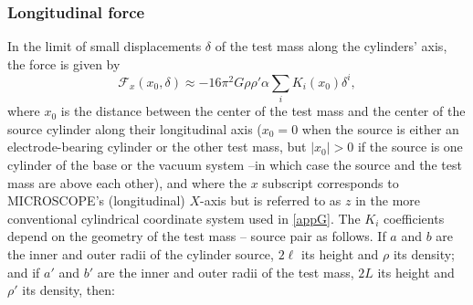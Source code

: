 \documentclass[12pt]{iopart}
\begin{document}
\subsubsection{Longitudinal force}

In the limit of small displacements $\delta$ of the test mass along the cylinders' axis, the force is given by
\begin{equation} \label{eq_gravx}
{\mathcal F}_x(x_0, \delta) \approx -16\pi^2 G \rho \rho' \alpha \sum_i K_i(x_0) \delta^i,
\end{equation}
where $x_0$ is the distance between the center of the test mass and the center of the source cylinder along their longitudinal axis ($x_0=0$ when the source is either an electrode-bearing cylinder or the other test mass, but $|x_0|>0$ if the source is one cylinder of the base or the vacuum system --in which case the source and the test mass are above each other), and where the $x$ subscript corresponds to MICROSCOPE's (longitudinal) $X$-axis but is referred to as $z$ in the more conventional cylindrical coordinate system used in \ref{appG}.
The $K_i$ coefficients depend on the geometry of the test mass -- source pair as follows. If $a$ and $b$ are the inner and outer radii of the cylinder source, $2\ell$ its height and $\rho$ its density; and if $a'$ and $b'$ are the inner and outer radii of the test mass, $2L$ its height and $\rho'$ its density, then:
\end{document}
